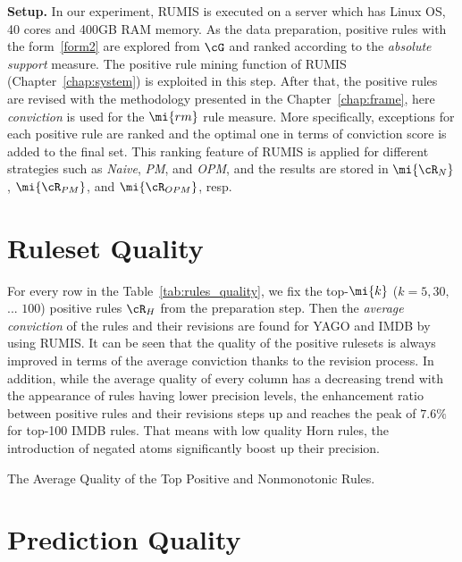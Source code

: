 \textbf{Setup.} In our experiment, RUMIS is executed on a server which has Linux OS, 40 cores and 400GB RAM memory. As the data preparation, positive rules with the form~\ref{form2} are explored from $\cG$ and ranked according to the \textit{absolute support} measure. The positive rule mining function of RUMIS (Chapter~\ref{chap:system}) is exploited in this step. After that, the positive rules are revised with the methodology presented in the Chapter~\ref{chap:frame}, here \textit{conviction} is used for the $\mi{rm}$ rule measure. More specifically, exceptions for each positive rule are ranked and the optimal one in terms of conviction score is added to the final set. This ranking feature of RUMIS is applied for different strategies such as \emph{Naive}, \emph{PM}, and \emph{OPM}, and the results are stored in $\mi{\cR_{N}}$, $\mi{\cR_{PM}}$, and $\mi{\cR_{OPM}}$, resp.

\section{Ruleset Quality}

For every row in the Table~\ref{tab:rules_quality}, we fix the top-$\mi{k}$ ($k=5,30,$ ... $100$) positive rules $\cR_{H}$ from the preparation step. Then the \textit{average conviction} of the rules and their revisions are found for YAGO and IMDB by using RUMIS. It can be seen that the quality of the positive rulesets is always improved in terms of the average conviction thanks to the revision process. In addition, while the average quality of every column has a decreasing trend with the appearance of rules having lower precision levels, the enhancement ratio between positive rules and their revisions steps up and reaches the peak of $7.6\%$ for top-100 IMDB rules. That means with low quality Horn rules, the introduction of negated atoms significantly boost up their precision.

\begin{table}[ht]
\centering
\footnotesize
\renewcommand*{\arraystretch}{1.07}
\centering

\smallskip
\caption{The Average Quality of the Top Positive and Nonmonotonic Rules.}
\label{tab:rules_quality}
\end{table}

\section{Prediction Quality}

